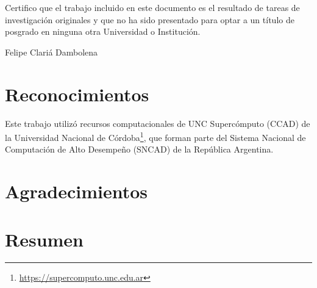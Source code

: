 \documentclass[spanish,a4paper,oneside,10pt,openright]{book}
\newcommand{\authorname}{{Felipe Clariá Dambolena}}
\newcommand{\unc}{{Universidad Nacional de Córdoba}}
\begin{document}
 \cleardoublepage


Certifico que el trabajo incluido en este documento es el resultado de tareas de investigación originales y que no ha sido presentado para optar a un título de posgrado en ninguna otra Universidad o Institución.

\vspace{3cm}
\begin{flushright}
\authorname
\end{flushright}
\cleardoublepage


\phantom{p. 1}
\thispagestyle{empty}

\chapter*{Reconocimientos}
Este trabajo utilizó recursos computacionales de UNC Supercómputo (CCAD) de la \unc \footnote{\url{https://supercomputo.unc.edu.ar}}, que forman parte del Sistema Nacional de Computación de Alto Desempeño (SNCAD) de la República Argentina.

\phantom{p. 1}
\clearpage
\thispagestyle{empty}
\phantom{p. 2}
\clearpage

\chapter*{Agradecimientos} %



\phantom{p. 1}
\clearpage
\thispagestyle{empty}
\phantom{p. 2}
\clearpage

\chapter*{Resumen} %

\end{document}
